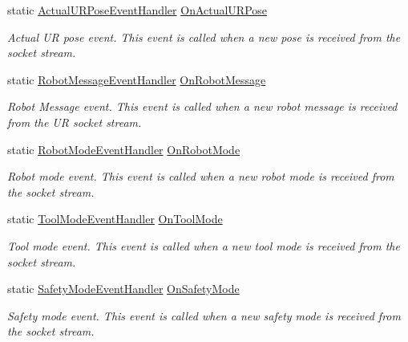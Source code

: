 \begin{DoxyCompactItemize}
\item 
static \hyperlink{class_robo_library_1_1_analyzer_a232f56c61a30de1de9e27021bf5dc77b}{Actual\+U\+R\+Pose\+Event\+Handler} \hyperlink{class_robo_library_1_1_analyzer_a5295d61bea6f0f95d4d7cf6a121efaec}{On\+Actual\+U\+R\+Pose}
\begin{DoxyCompactList}\small\item\em Actual UR pose event. This event is called when a new pose is received from the socket stream.\end{DoxyCompactList}\item 
static \hyperlink{class_robo_library_1_1_analyzer_a985396dd045b907a73d7b627b9bd07dc}{Robot\+Message\+Event\+Handler} \hyperlink{class_robo_library_1_1_analyzer_ad2f4496aa598c9e9a8380c484aacdb5d}{On\+Robot\+Message}
\begin{DoxyCompactList}\small\item\em Robot Message event. This event is called when a new robot message is received from the UR socket stream.\end{DoxyCompactList}\item 
static \hyperlink{class_robo_library_1_1_analyzer_aa1d0cf635115d275b8488aab662610fa}{Robot\+Mode\+Event\+Handler} \hyperlink{class_robo_library_1_1_analyzer_a18356690d4cc11656007057cca93f278}{On\+Robot\+Mode}
\begin{DoxyCompactList}\small\item\em Robot mode event. This event is called when a new robot mode is received from the socket stream.\end{DoxyCompactList}\item 
static \hyperlink{class_robo_library_1_1_analyzer_a6d2960ef27111be171f8c9d6a7d2a058}{Tool\+Mode\+Event\+Handler} \hyperlink{class_robo_library_1_1_analyzer_aed192ad0336a1115cf10504bcf5abfc5}{On\+Tool\+Mode}
\begin{DoxyCompactList}\small\item\em Tool mode event. This event is called when a new tool mode is received from the socket stream.\end{DoxyCompactList}\item 
static \hyperlink{class_robo_library_1_1_analyzer_ae03a29ceaec0141398e05cba9cbfba4d}{Safety\+Mode\+Event\+Handler} \hyperlink{class_robo_library_1_1_analyzer_a77e89608a449d5ae30eadf9b2d1ed8e3}{On\+Safety\+Mode}
\begin{DoxyCompactList}\small\item\em Safety mode event. This event is called when a new safety mode is received from the socket stream.\end{DoxyCompactList}\end{DoxyCompactItemize}


